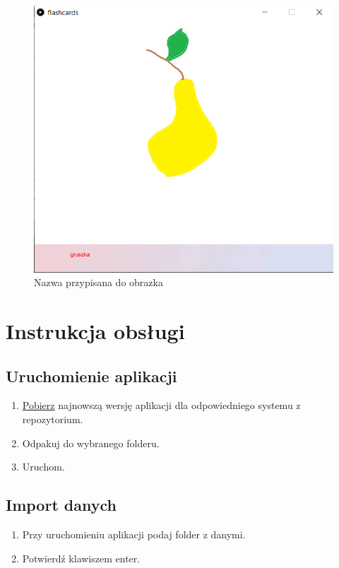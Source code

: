 \documentclass[11pt]{article}
\begin{document}
    \begin{figure}\label{ss3}
    \centering
    \includegraphics{Screenshot_3.png}
    \caption{Nazwa przypisana do obrazka}
    \end{figure}

    \newpage

    \section{Instrukcja obsługi}\label{sec:user-manual}

    \subsection{Uruchomienie aplikacji}\label{subsec:setup}

    \begin{enumerate}
        \item \href{https://github.com/BWalusiak/flashcards/releases}{Pobierz} najnowszą wersję aplikacji dla odpowiedniego systemu z repozytorium.
        \item Odpakuj do wybranego folderu.
        \item Uruchom.
    \end{enumerate}

    \subsection{Import danych}\label{subsec:data-import}

    \begin{enumerate}
        \item Przy uruchomieniu aplikacji podaj folder z danymi.
        \item Potwierdź klawiszem enter.
    \end{enumerate}
\end{document}
